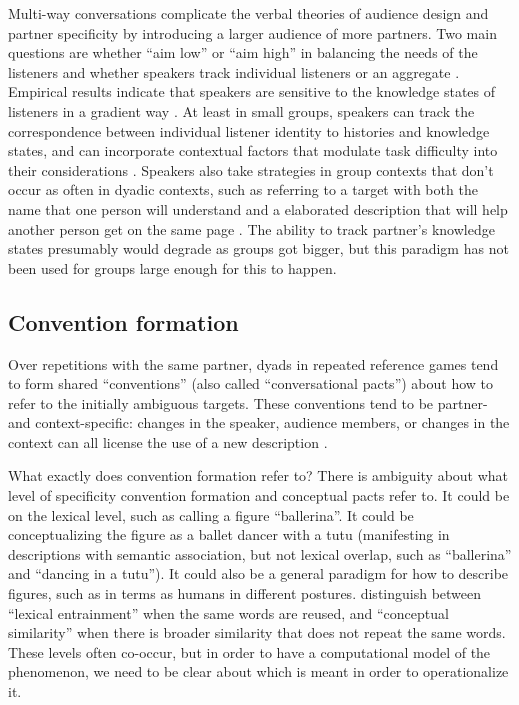 \documentclass[]{article}
\begin{document}
Multi-way conversations complicate the verbal theories of audience design and partner specificity by introducing a larger audience of more partners. Two main questions are whether ``aim low'' or ``aim high'' in balancing the needs of the listeners and whether speakers track individual listeners or an aggregate \citep{yoon2014}. Empirical results indicate that speakers are sensitive to the knowledge states of listeners in a gradient way \citep{yoon2014, yoon2018, yoon2019}. At least in small groups, speakers can track the correspondence between individual listener identity to histories and knowledge states, and can incorporate contextual factors that modulate task difficulty into their considerations \citep{yoon2019a}. Speakers also take strategies in group contexts that don't occur as often in dyadic contexts, such as referring to a target with both the name that one person will understand and a elaborated description that will help another person get on the same page \citep{yoon2018}. The ability to track partner's knowledge states presumably would degrade as groups got bigger, but this paradigm has not been used for groups large enough for this to happen. 

\subsection{Convention formation}
Over repetitions with the same partner, dyads in repeated reference games tend to form shared ``conventions'' (also called ``conversational pacts'') about how to refer to the initially ambiguous targets. These conventions tend to be partner- and context-specific: changes in the speaker, audience members, or changes in the context can all license the use of a new description \citep{metzing2003a, ibarra2016, yoon2014}.

What exactly does convention formation refer to? There is ambiguity about what level of specificity convention formation and conceptual pacts refer to. It could be on the lexical level, such as calling a figure ``ballerina''. It could be conceptualizing the figure as a ballet dancer with a tutu (manifesting in descriptions with semantic association, but not lexical overlap, such as ``ballerina'' and ``dancing in a tutu''). It could also be a general paradigm for how to describe figures, such as in terms as humans in different postures.  \citet{horton2002a} distinguish between ``lexical entrainment'' when the same words are reused, and ``conceptual similarity'' when there is broader similarity that does not repeat the same words. These levels often co-occur, but in order to have a computational model of the phenomenon, we need to be clear about which is meant in order to operationalize it.  
\end{document}
